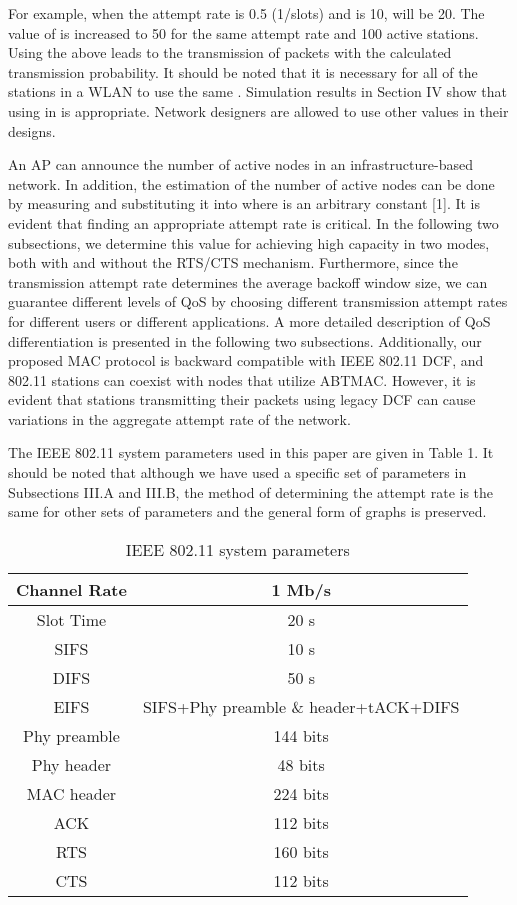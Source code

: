 \documentclass[10pt,twocolumn,oneside,submit]{JCNtran}
\begin{document}
For example, when the attempt rate is 0.5 (1/slots) and  is 10,  will be 20. The value of  is increased to 50 for the same attempt rate and 100 active stations. Using the above  leads to the transmission of packets with the calculated transmission probability. It should be noted that it is necessary for all of the stations in a WLAN to use the same . Simulation results in Section IV show that using  in  is appropriate. Network designers are allowed to use other values in their designs. 

An AP can announce the number of active nodes in an infrastructure-based network. In addition, the estimation of the number of active nodes can be done by measuring  and substituting it into  where  is an arbitrary constant [1]. It is evident that finding an appropriate attempt rate is critical. In the following two subsections, we determine this value for achieving high capacity in two modes, both with and without the RTS/CTS mechanism. Furthermore, since the transmission attempt rate determines the average backoff window size, we can guarantee different levels of QoS by choosing different transmission attempt rates for different users or different applications. A more detailed description of QoS differentiation is presented in the following two subsections. Additionally, our proposed MAC protocol is backward compatible with IEEE 802.11 DCF, and 802.11 stations can coexist with nodes that utilize ABTMAC. However, it is evident that stations transmitting their packets using legacy DCF can cause variations in the aggregate attempt rate of the network.

The IEEE 802.11 system parameters used in this paper are given in Table 1. It should be noted that although we have used a specific set of parameters in Subsections III.A and III.B, the method of determining the attempt rate is the same for other sets of parameters and the general form of graphs is preserved.

\begin{table}
\caption{IEEE 802.11 system parameters}
\label{tab:tab1}
\begin{center}
{\small \begin{tabular}{|c|c|}\hline
Channel Rate & 1 Mb/s\\ \hline
Slot Time & 20 s\\ \hline
SIFS & 10 s\\ \hline
DIFS & 50 s\\ \hline
EIFS & SIFS+Phy preamble \& header+tACK+DIFS\\ \hline
Phy preamble & 144 bits\\ \hline
Phy header & 48 bits\\ \hline
MAC header & 224 bits\\ \hline
ACK & 112 bits\\ \hline
RTS & 160 bits\\ \hline
CTS & 112 bits\\ \hline
\end{tabular}}
\end{center}
\end{table}
\end{document}
